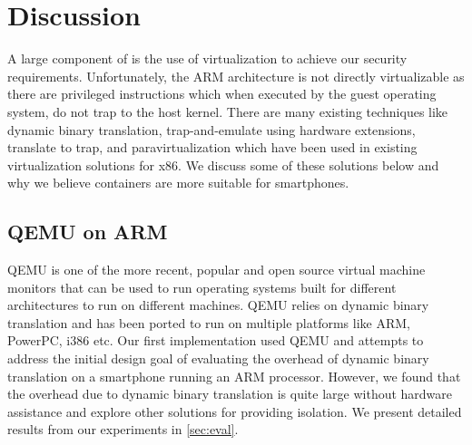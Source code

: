 \section{Discussion}
\label{sec:discuss}

A large component of \emph{\proj} is the use of virtualization to achieve our security requirements.  Unfortunately, the ARM architecture is not directly virtualizable as there are privileged instructions which when executed by the guest operating system, do not trap to the host kernel. There are many existing techniques like dynamic binary translation, trap-and-emulate using hardware extensions, translate to trap, and paravirtualization which have been used in existing virtualization solutions for x86. We discuss some of these solutions below and why we believe containers are more suitable for smartphones.

\subsection{QEMU on ARM}
QEMU \cite{qemu} is one of the more recent, popular and open source virtual machine monitors that can be used to run operating systems built for different architectures to run on different machines. QEMU relies on dynamic binary translation and has been ported to run on multiple platforms like ARM, PowerPC, i386 etc. Our first implementation used QEMU and attempts to address the initial design goal of evaluating the overhead of dynamic binary translation on a smartphone running an ARM processor. However, we found that the overhead due to dynamic binary translation is quite large without hardware assistance and explore other solutions for providing isolation. We present detailed results from our experiments in \ref{sec:eval}.

